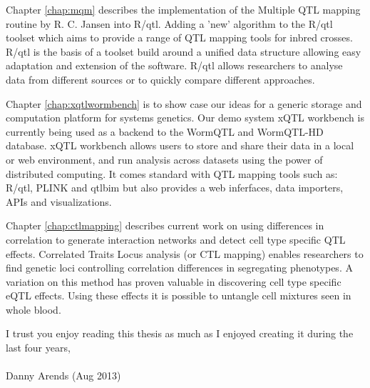 \documentclass[8pt, twoside]{book}
\begin{document}
Chapter \ref{chap:mqm} describes the implementation of the Multiple QTL mapping routine 
by R. C. Jansen into R/qtl. Adding a 'new' algorithm to the R/qtl toolset which aims to 
provide a range of QTL mapping tools for inbred crosses. R/qtl is the basis of a toolset 
build around a unified data structure allowing easy adaptation and extension of the software. 
R/qtl allows researchers to analyse data from different sources or to quickly compare 
different approaches.

Chapter \ref{chap:xqtlwormbench} is to show case our ideas for a generic storage and 
computation platform for systems genetics. Our demo system xQTL workbench is currently 
being used as a backend to the WormQTL and WormQTL-HD database. xQTL workbench allows 
users to store and share their data in a local or web environment, and run analysis across 
datasets using the power of distributed computing. It comes standard with QTL mapping 
tools such as: R/qtl, PLINK and qtlbim but also provides a web inferfaces, data importers, 
APIs and visualizations.

Chapter \ref{chap:ctlmapping} describes current work on using differences in correlation to 
generate interaction networks and detect cell type specific QTL effects. Correlated Traits 
Locus analysis (or CTL mapping) enables researchers to find genetic loci controlling correlation 
differences in segregating phenotypes. A variation on this method has proven valuable in 
discovering cell type specific eQTL effects. Using these effects it is possible 
to untangle cell mixtures seen in whole blood.

I trust you enjoy reading this thesis as much as I enjoyed creating it during the last four years,\\\\

Danny Arends (Aug 2013)
\newpage
\thispagestyle{empty}


















{\tiny

}
\end{document}
